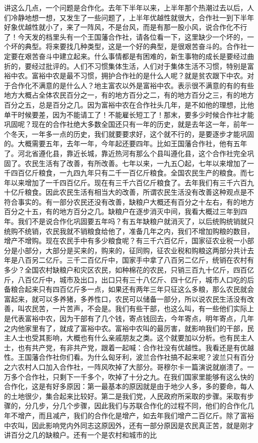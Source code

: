 讲这么几点，一个问题是合作化。去年下半年以来，上半年那个热潮过去以后，人们冷静地想一想，又发生了一些问题了，上半年优越性就很大，合作社一到下半年好象优越性就小了，来了一阵风，不是台风，而是有那一股小风，说合作化不行了！今天发的档里头有一个王国藩合作社，请各位看一下，这里缺少一个坏的，一个坏的典型。将来要找几种类型，这是一个好的典型，是很艰苦奋斗的。合作社一定要在艰苦奋斗中建立起来。什么事情都是有困难的，新生事物的成长是要经过曲折的，要经过批评的。人们不习惯集体生活，人们对于集体生活不习惯，特别是富裕中农。富裕中农是最不习惯，拥护合作社的是什么人呢？就是贫农跟下中农。对于合作化不满意的是什么人？地主富农以外是富裕中农。表示很不满意的有的有些地方大概占全体农民百分之一，有的地方百分之二，有的地方百分之三，有的地方百分之五，总是百分之几。因为富裕中农在合作社头几年，是不如他的理想，比他单干时候要差，因为不能请工了！不能雇长短工了！那末，要多少时候合作社才能巩固呢？现在的合作社绝大多数全国还只有一年的历史，就是去年这一年，前年一个冬天，一年多一点的历史，我们就要要求好，这个就不行的，是要逐步才能巩固的。大概需要五年，去年一年，今年起还要四年。比如王国藩合作社，他有五年了。河北省遵化县，靠近长城，靠近热河有那么个县叫遵化县，这个合作社完全巩固了。农民生活有了改善，有所改善。七年以来，一九五〇起，七年以来增加了一千四百亿斤粮食，一九四九年只有二千一百亿斤粮食。全国农民生产的粮食。而七年以来增加了一千四百亿斤。现在有三千六百亿斤粮食了。去年我们有三千六百九十亿斤粮食。因此农民生活有相当大的改善，所谓农民生活没有改善这种观点是不符合事实的。有一部分农民还没有改善，缺粮户大概还有百分之十左右，有的地方百分之十五，有的地方百分之几。缺粮户在逐步消灭中间，我看大概过三年到四年。我们不是说合作化巩固要五年吗？有五年缺粮户就消灭了，以后统购统销就只统购不统销，农民我就不销粮食给他了，准备几年之内，我们不增加购粮的数目，增产不增购。现在农民手中有多少粮食呢？有三千六百亿斤，国家征农业税一小部分是小部分，大部分是买来的，购来的，征同购，征农业税和购粮这两部分共计去年是八百另二亿斤。三千二百亿斤中，国家手中拿了八百另二亿斤，统销在农村有多少？全国农村缺粮户和灾区农民，如种棉花的农民，只销三百九十亿斤，四百亿斤，八百亿斤中，城市及出口，出口只有三十八亿斤、四十亿斤，城市人口吃的后备粮合起来只有四百亿斤多一点，如果还有两年三年只征这么多粮，那么农民就会富起来，就可以多养猪，多养性口，农民可以储备一部分，所以说农民生活没有改善，叫农民苦，一片苦声，不会是。我们有些干部，也这么叫，有一些他们实际上是代表富裕中农，因为干部有了几个钱，寄点钱回去，今年寄点，明年寄点，几年之内他家里有了，就成了富裕中农。富裕中农叫的最厉害，就影响我们的干部，民主人士也受其影响，大概也有什么亲戚朋友之类。这个就要加以分析。也有民主人士，也有共产党，有非共产党，跟着一起喊：合作社没有优越性。我看还是有优越性。王国藩合作社你们看。为什么匈牙利，波兰合作社搞不起来呢？波兰只有百分之六农村人口加入合作社，一阵风吹掉了大部分。哥穆尔卡一篇演说就崩溃了。一万多个合作社，只剩下一千多个，吹掉了十分之九。在我们国家里能够有这么快的合作化，这是有好多原因：第一最基本的原因就是由于地少人多，多的要命，每人的土地很少，集合起来比较好。第二是我们党，人民政府所采取的步骤。采取有步骤的，分几步，分几个步骤，因此我们与苏联合作化的过程不同，他们的合作化几年不增产，而且减产，我们的合作化是增产，如去年我们增产二百亿斤。除了富裕中农叫，因此影响党内外同志这原因外，还有一部分原因是农民真正苦，就是刚才讲百分之几的缺粮户。还有一个是农村和城市的比